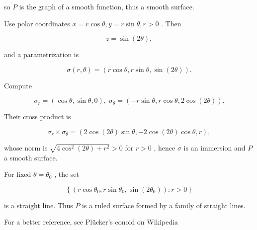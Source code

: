 \documentclass[10pt]{article}
\begin{document}
so \(P\) is the graph of a smooth function, thus a smooth surface.

Use polar coordinates \(x = r\cos \theta ,y = r\sin \theta ,r > 0\) . Then

\[
z = \sin \left( {2\theta }\right) ,
\]

and a parametrization is

\[
\sigma \left( {r,\theta }\right)  = \left( {r\cos \theta ,r\sin \theta ,\sin \left( {2\theta }\right) }\right) .
\]

Compute

\[
{\sigma }_{r} = \left( {\cos \theta ,\sin \theta ,0}\right) ,\;{\sigma }_{\theta } = \left( {-r\sin \theta ,r\cos \theta ,2\cos \left( {2\theta }\right) }\right) .
\]

Their cross product is

\[
{\sigma }_{r} \times  {\sigma }_{\theta } = \left( {2\cos \left( {2\theta }\right) \sin \theta , - 2\cos \left( {2\theta }\right) \cos \theta ,r}\right) ,
\]

whose norm is \(\sqrt{4{\cos }^{2}\left( {2\theta }\right)  + {r}^{2}} > 0\) for \(r > 0\) , hence \(\sigma\) is an immersion and \(P\) a smooth surface.

For fixed \(\theta  = {\theta }_{0}\) , the set

\[
\left\{  {\left( {r\cos {\theta }_{0},r\sin {\theta }_{0},\sin \left( {2{\theta }_{0}}\right) }\right)  : r > 0}\right\}
\]

is a straight line. Thus \(P\) is a ruled surface formed by a family of straight lines.

For a better reference, see Plücker's conoid on Wikipedia
\end{document}
